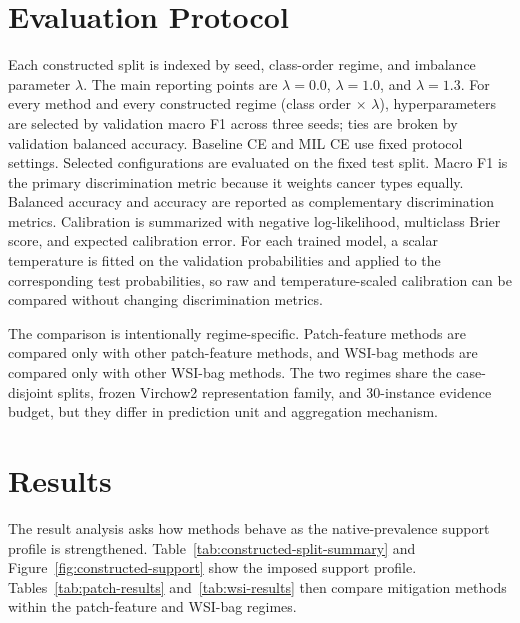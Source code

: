 \documentclass[11pt]{article}
\begin{document}
\section{Evaluation Protocol}
\label{sec:evaluation}
Each constructed split is indexed by seed, class-order regime, and imbalance parameter $\lambda$. The main reporting points are $\lambda=0.0$, $\lambda=1.0$, and $\lambda=1.3$. For every method and every constructed regime (class order $\times$ $\lambda$), hyperparameters are selected by validation macro F1 across three seeds; ties are broken by validation balanced accuracy. Baseline CE and MIL CE use fixed protocol settings. Selected configurations are evaluated on the fixed test split. Macro F1 is the primary discrimination metric because it weights cancer types equally. Balanced accuracy and accuracy are reported as complementary discrimination metrics. Calibration is summarized with negative log-likelihood, multiclass Brier score, and expected calibration error. For each trained model, a scalar temperature is fitted on the validation probabilities and applied to the corresponding test probabilities, so raw and temperature-scaled calibration can be compared without changing discrimination metrics.

The comparison is intentionally regime-specific. Patch-feature methods are compared only with other patch-feature methods, and WSI-bag methods are compared only with other WSI-bag methods. The two regimes share the case-disjoint splits, frozen Virchow2 representation family, and 30-instance evidence budget, but they differ in prediction unit and aggregation mechanism.

\section{Results}
\label{sec:results}
The result analysis asks how methods behave as the native-prevalence support profile is strengthened. Table~\ref{tab:constructed-split-summary} and Figure~\ref{fig:constructed-support} show the imposed support profile. Tables~\ref{tab:patch-results} and~\ref{tab:wsi-results} then compare mitigation methods within the patch-feature and WSI-bag regimes.

\begin{table}[ht]
  \centering
  \caption{Constructed training-support summaries by class-order regime and imbalance severity.}
  \label{tab:constructed-split-summary}
\end{table}
\end{document}
